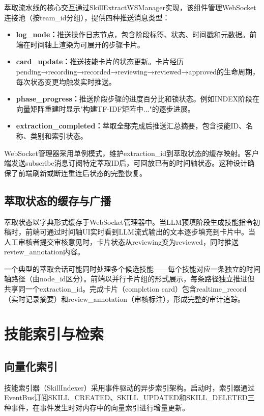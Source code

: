 \documentclass[conference]{IEEEtran}
\begin{document}
萃取流水线的核心交互通过SkillExtractWSManager实现，该组件管理WebSocket连接池（按team\_id分组），提供四种推送消息类型：

\begin{itemize}[nosep]
\item \textbf{log\_node：}推送操作日志节点，包含阶段标签、状态、时间戳和元数据。前端在时间轴上渲染为可展开的步骤卡片。
\item \textbf{card\_update：}推送技能卡片的状态更新。卡片经历pending→recording→recorded→reviewing→reviewed→approved的生命周期，每次状态变更均触发实时推送。
\item \textbf{phase\_progress：}推送阶段步骤的进度百分比和锁状态。例如INDEX阶段在向量矩阵重建时显示"构建TF-IDF矩阵中..."的逐步进展。
\item \textbf{extraction\_completed：}萃取全部完成后推送汇总摘要，包含技能ID、名称、类别和索引状态。
\end{itemize}

WebSocket管理器采用单例模式，维护extraction\_id到萃取状态的缓存映射。客户端发送subscribe消息订阅特定萃取ID后，可回放已有的时间轴状态。这种设计确保了前端刷新或断连重连后状态的完整恢复。

\subsection{萃取状态的缓存与广播}

萃取状态以字典形式缓存于WebSocket管理器中。当LLM预填阶段生成技能指令初稿时，前端可通过时间轴UI实时看到LLM流式输出的文本逐步填充到卡片中。当人工审核者提交审核意见时，卡片状态从reviewing变为reviewed，同时推送review\_annotation内容。

一个典型的萃取会话可能同时处理多个候选技能——每个技能对应一条独立的时间轴路径（由node\_id区分）。前端以并行卡片组的形式展示，每条路径独立推进但共享同一个extraction\_id。完成卡片（completion card）包含realtime\_record（实时记录摘要）和review\_annotation（审核标注），形成完整的审计追踪。

\section{技能索引与检索}

\subsection{向量化索引}

技能索引器（SkillIndexer）采用事件驱动的异步索引架构。启动时，索引器通过EventBus订阅SKILL\_CREATED、SKILL\_UPDATED和SKILL\_DELETED三种事件，在事件发生时对内存中的向量索引进行增量更新。
\end{document}
